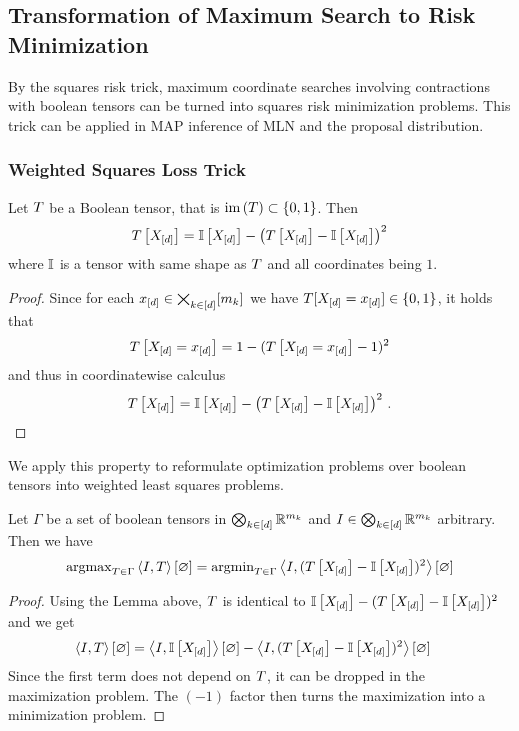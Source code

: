 \subsection{Transformation of Maximum Search to Risk Minimization}

By the squares risk trick, maximum coordinate searches involving contractions with boolean tensors can be turned into squares risk minimization problems.
This trick can be applied in MAP inference of MLN and the proposal distribution.

\subsubsection{Weighted Squares Loss Trick}

\begin{lemma}
	Let $T$ be a Boolean tensor, that is $\mathrm{im}\left(T\right)\subset\{0,1\}$.
	Then
		\[ T\left[X_{[d]}\right] = \mathbb{I}\left[X_{[d]}\right] - \left( T\left[X_{[d]}\right] - \mathbb{I}\left[X_{[d]}\right] \right)^2  \]
	where $\mathbb{I}$ is a tensor with same shape as $T$ and all coordinates being $1$.
\end{lemma}
\begin{proof}
	Since for each $x_{[d]}\in\bigtimes_{k\in[d]}[m_{k}]$ we have $T[X_{[d]}=x_{[d]}]\in\{0,1\}$, it holds that
		\[ T\left[X_{[d]}=x_{[d]}\right] = 1 - (T\left[X_{[d]}=x_{[d]}\right]-1)^2 \]
	and thus in coordinatewise calculus
		\[ T\left[X_{[d]}\right] = \mathbb{I}\left[X_{[d]}\right] - \left( T\left[X_{[d]}\right] - \mathbb{I}\left[X_{[d]}\right] \right)^2 \, .   \]
\end{proof}

We apply this property to reformulate optimization problems over boolean tensors into weighted least squares problems.

\begin{theorem}\label{the:reweightedLeastSquares}
	Let $\Gamma$ be a set of boolean tensors in $\bigotimes_{k\in[d]} \mathbb{R}^{m_{k}}$ and $I\in\bigotimes_{k\in[d]} \mathbb{R}^{m_{k}}$ arbitrary.
	Then we have
	\begin{align}
		\mathrm{argmax}_{T\in\Gamma} \left\langle I,T\right\rangle \left[ \varnothing \right] 
		= \mathrm{argmin}_{T\in\Gamma} \left\langle I, (T\left[X_{[d]}\right]-\mathbb{I}\left[X_{[d]}\right])^2\right\rangle \left[ \varnothing \right]
	\end{align} 
\end{theorem}
\begin{proof}
	Using the Lemma above, $T$ is identical to $\mathbb{I}\left[X_{[d]}\right]-(T\left[X_{[d]}\right]-\mathbb{I}\left[X_{[d]}\right])^2$ and we get
	\begin{align*}
		 \left\langle I,T\right\rangle \left[ \varnothing \right] 
		 &=  \left\langle I,\mathbb{I}\left[X_{[d]}\right]\right\rangle \left[ \varnothing \right]-\left\langle I,(T\left[X_{[d]}\right]-\mathbb{I}\left[X_{[d]}\right])^2\right\rangle \left[ \varnothing \right] 
	\end{align*}
	Since the first term does not depend on $T$, it can be dropped in the maximization problem.
	The $(-1)$ factor then turns the maximization into a minimization problem.
\end{proof}

